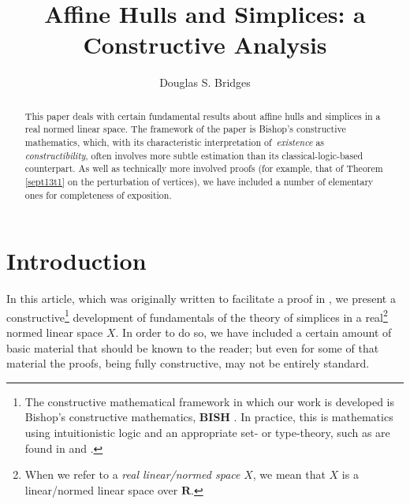 \documentclass[11pt]{article}%
\begin{document}
\title{Affine Hulls and Simplices: a Constructive Analysis}
\author{Douglas S. Bridges}
\maketitle

\begin{abstract}%
\noindent
This paper deals with certain fundamental results about affine hulls and
simplices in a real normed linear space. The framework of the paper is
Bishop's constructive mathematics, which, with its characteristic
interpretation of\ \emph{existence }as \emph{constructibility}, often involves
more subtle estimation than its classical-logic-based counterpart. As well as
technically more involved proofs (for example, that of Theorem \ref{sept13t1}
on the perturbation of vertices), we have included a number of elementary ones
for completeness of exposition.

\end{abstract}

%

\setcounter{secnumdepth}{0}%
\normalfont\sf


\section{Introduction}

In this article, which was originally written to facilitate a proof in
\cite{DSBmcom}, we present a constructive\footnote{%
\normalfont\sf
The constructive mathematical framework in which our work is developed is
Bishop's constructive mathematics, \textbf{BISH}
\cite{Bishop,BB,BVtech,Handbook}. In practice, this is mathematics using
intuitionistic logic and an appropriate set- or type-theory, such as are found
in \cite[Chs. 1,2]{Handbook} and \cite{Balps,BMorse,DP}.} development of
fundamentals of the theory of simplices in a real\footnote{%
\normalfont\sf
When we refer to a \emph{real linear/normed space} $X$, we mean that $X$ is a
linear/normed linear space over $\mathbf{R}$.} normed linear space $X$. In
order to do so, we have included a certain amount of basic material that
should be known to the reader; but even for some of that material the proofs,
being fully constructive, may not be entirely standard.
\end{document}
